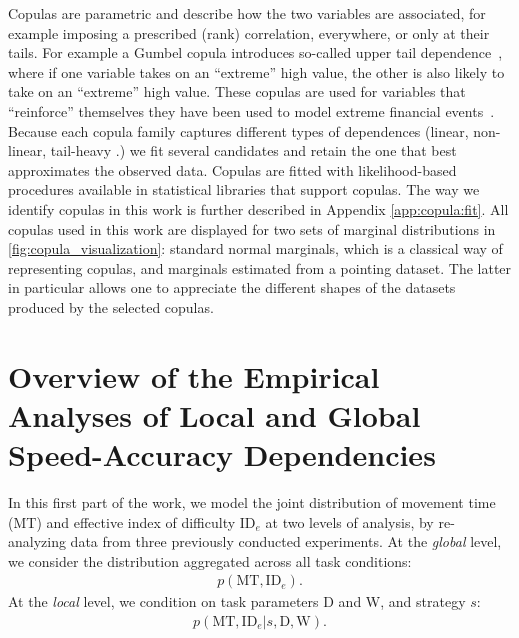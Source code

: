\documentclass[acmlarge, manuscript,review]{acmart}
\newcommand{\mt}{\ensuremath{{\text{MT}}}\xspace}
\newcommand{\ide}{\ensuremath{{\text{ID}_e}}\xspace}
\newcommand{\D}{\ensuremath{{\text{D}}}\xspace}
\newcommand{\W}{\ensuremath{{\text{W}}}\xspace}
\begin{document}
Copulas are parametric and describe how the two variables are associated, for example imposing a prescribed (rank) correlation, everywhere, or only at their tails.
For example a Gumbel copula introduces so-called upper tail dependence~\cite{nelsen2006}, where if one variable takes on an ``extreme'' high value, the other is also likely to take on an ``extreme'' high value. These copulas are used for variables that ``reinforce'' themselves \eg they have been used to model extreme financial events~\cite{dewick2022}.
Because each copula family captures different types of dependences (linear, non-linear, tail-heavy \etc.) we fit several candidates and retain the one that best approximates the observed data. Copulas are fitted with likelihood-based procedures available in statistical libraries that support copulas.
The way we identify copulas in this work is further described in Appendix \ref{app:copula:fit}. All copulas used in this work are displayed for two sets of marginal distributions in \autoref{fig:copula_visualization}: standard normal marginals, which is a classical way of representing copulas, and marginals estimated from a pointing dataset. The latter in particular allows one to appreciate the different shapes of the datasets produced by the selected copulas.


\section{Overview of the Empirical Analyses of Local and Global Speed-Accuracy Dependencies\label{sec:outline}}
In this first part of the work, we model the joint distribution of movement time (MT) and effective index of difficulty \ide at two levels of analysis, by re-analyzing data from three previously conducted experiments.
At the \emph{global} level, we consider the distribution aggregated across all task conditions:
\begin{align}
  p(\mt, \ide). \label{eq:joint_global}
\end{align}
At the \emph{local} level, we condition on task parameters D and W, and strategy $s$:
\begin{align}
  p(\mt, \ide | s, \D, \W). \label{eq:joint_local}
\end{align}
\end{document}
